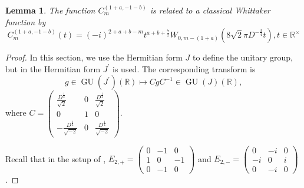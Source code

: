 \documentclass[11pt, a4paper]{amsart}
\theoremstyle{plain}
\newtheorem{lemma}[theorem]{Lemma}
\theoremstyle{definition}
\numberwithin{equation}{section}
\def\RR{\mathbb{R}}
\DeclareMathOperator{\GU}{GU}
\begin{document}
\begin{lemma}
\label{Lemma: relation C and W}
    The function $C_{m}^{(1+a, -1-b)}$ is related to a classical Whittaker function by
             \begin{equation*}
                 C_m^{(1+a, -1-b)}(t) = (-i)^{2 + a + b -m}t^{a + b + \frac{7}{2}} W_{0, m-(1+a)}(8\sqrt{2} \pi D^{-\frac{3}{4}}t), t \in \RR^{\times}
             \end{equation*}
\end{lemma}

\begin{proof}
    In this section, we use the Hermitian form $J$ to define the unitary group, but in \cite{Koseki-Oda95} the Hermitian form $J^{\prime}$ is used. The corresponding transform is 
    \begin{equation*}
        g \in \GU(J^{\prime})(\RR) \mapsto CgC^{-1} \in \GU(J)(\RR), 
    \end{equation*}
    where $C = \begin{pmatrix}
                  \frac{D^{\frac{1}{4}}}{\sqrt{2}} & 0 & \frac{D^{\frac{1}{4}}}{\sqrt{2}} \\
                   0 & 1 & 0 \\
                   -\frac{D^{\frac{1}{4}}}{\sqrt{-2}} & 0 & \frac{D^{\frac{1}{4}}}{\sqrt{-2}}
              \end{pmatrix}$.
    \par Recall that in the setup of \cite{Koseki-Oda95}, $E_{2, +} = \begin{pmatrix}
                                                                     0 & -1 & 0 \\
                                                                     1 & 0 & -1 \\
                                                                     0 & -1 & 0
                                                                    \end{pmatrix}$ and $E_{2, -} = \begin{pmatrix}
                                                                                                 0 & -i & 0 \\
                                                                                                 -i & 0 & i \\
                                                                                                 0 & -i & 0
                                                                                                \end{pmatrix}$.

\end{proof}
\end{document}
